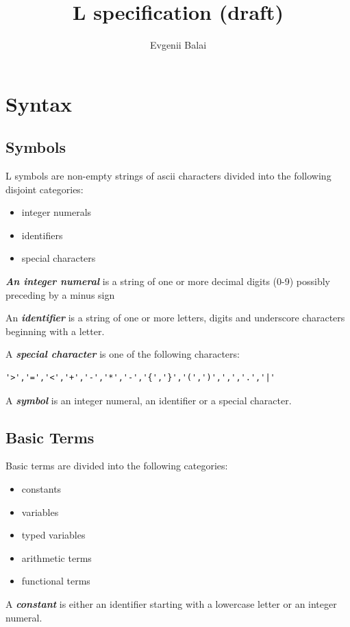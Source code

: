 \documentclass[a4paper,10pt]{article}
\title{L specification (draft)}
\author{Evgenii Balai}
\def\st{\noindent}
\begin{document}
\maketitle
\st
\setcounter{tocdepth}{2}
\tableofcontents
\section{Syntax}
\subsection{Symbols}\label{symbols}
L symbols are non-empty strings of ascii characters divided into the following disjoint categories:
\begin{itemize}
\item integer numerals
\item identifiers
\item special characters
\end{itemize}

\textbf{\textit{An integer numeral}} is a string of one or more decimal digits (0-9) possibly preceding by a minus sign


An \textbf{\textit{identifier}} is a  string of one or more letters, digits and underscore characters beginning with a letter. 

A \textbf{\textit{special character}} is one of the following characters:
\begin{verbatim}
'>','=','<','+','-','*','-','{','}','(',')',',','.','|'
\end{verbatim}

A \textbf{\textit{symbol}} is an integer numeral, an identifier or a special character.
\subsection{Basic Terms}
Basic terms are divided into the following categories:
\begin{itemize}
\item constants
\item variables
\item typed variables
\item arithmetic terms
\item functional terms
\end{itemize}

A \textit{\textbf{constant}} is either an identifier starting with a lowercase letter or an integer numeral. 
\end{document}
